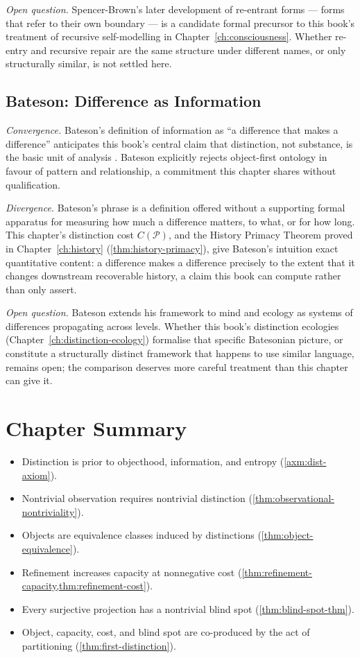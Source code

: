 \documentclass[12pt,twoside,openright]{book}
\newcommand{\partition}{\mathcal{P}}
\newenvironment{chapsummary}{%
  \begin{tcolorbox}[colback=DistBlue!5,colframe=DistBlue,
    title={\faBookOpen\enspace Summary},
    fonttitle=\sffamily\bfseries\color{white},
    attach boxed title to top left={yshift=-2mm,xshift=4mm},
    boxed title style={colback=DistBlue,rounded corners}]
  \begin{itemize}[nosep,leftmargin=*]}{%
  \end{itemize}\end{tcolorbox}}
\begin{document}
\emph{Open question.} Spencer-Brown's later development of
re-entrant forms --- forms that refer to their own boundary ---
is a candidate formal precursor to this book's treatment of
recursive self-modelling in Chapter~\ref{ch:consciousness}.
Whether re-entry and recursive repair are the same structure
under different names, or only structurally similar, is not
settled here.

\subsection*{Bateson: Difference as Information}

\emph{Convergence.} Bateson's definition of information as
``a difference that makes a difference'' anticipates this
book's central claim that distinction, not substance, is the
basic unit of analysis \parencite{bateson1972}. Bateson
explicitly rejects object-first ontology in favour of pattern
and relationship, a commitment this chapter shares without
qualification.

\emph{Divergence.} Bateson's phrase is a definition offered
without a supporting formal apparatus for measuring how much a
difference matters, to what, or for how long. This chapter's
distinction cost $C(\partition)$, and the History Primacy
Theorem proved in Chapter~\ref{ch:history}
(\cref{thm:history-primacy}), give Bateson's intuition exact
quantitative content: a difference makes a difference precisely
to the extent that it changes downstream recoverable history, a
claim this book can compute rather than only assert.

\emph{Open question.} Bateson extends his framework to mind and
ecology as systems of differences propagating across levels.
Whether this book's distinction ecologies
(Chapter~\ref{ch:distinction-ecology}) formalise that specific
Batesonian picture, or constitute a structurally distinct
framework that happens to use similar language, remains open;
the comparison deserves more careful treatment than this
chapter can give it.

\section*{Chapter Summary}
\begin{chapsummary}
  \item Distinction is prior to objecthood, information,
        and entropy (\cref{axm:dist-axiom}).
  \item Nontrivial observation requires nontrivial
        distinction
        (\cref{thm:observational-nontriviality}).
  \item Objects are equivalence classes induced by
        distinctions (\cref{thm:object-equivalence}).
  \item Refinement increases capacity at nonnegative cost
        (\cref{thm:refinement-capacity,thm:refinement-cost}).
  \item Every surjective projection has a nontrivial
        blind spot (\cref{thm:blind-spot-thm}).
  \item Object, capacity, cost, and blind spot are
        co-produced by the act of partitioning
        (\cref{thm:first-distinction}).
\end{chapsummary}
\end{document}
